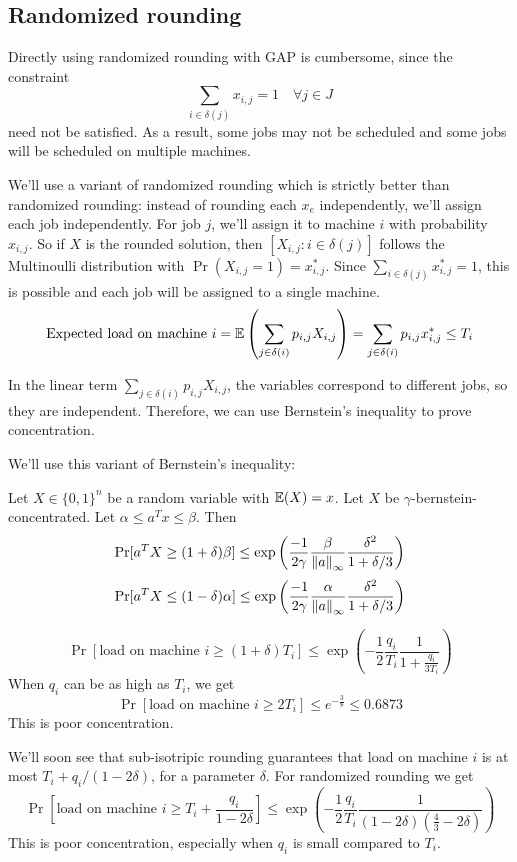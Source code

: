 \subsection{Randomized rounding}

Directly using randomized rounding with GAP is cumbersome, since the constraint
\[ \sum_{i \in \delta(j)} x_{i,j} = 1 \quad \forall j \in J \]
need not be satisfied. As a result, some jobs may not be scheduled
and some jobs will be scheduled on multiple machines.

We'll use a variant of randomized rounding which is strictly better than randomized rounding:
instead of rounding each $x_e$ independently, we'll assign each job independently.
For job $j$, we'll assign it to machine $i$ with probability $x_{i,j}$.
So if $X$ is the rounded solution, then $[X_{i,j}: i \in \delta(j)]$
follows the Multinoulli distribution with $\Pr(X_{i,j} = 1) = x_{i,j}^*$.
Since $\sum_{i \in \delta(j)} x_{i,j}^* = 1$, this is possible and each job
will be assigned to a single machine.
\[ \textrm{Expected load on machine } i
= \operatorname{\mathbb{E}}\left(\sum_{j \in \delta(i)} p_{i,j}X_{i,j}\right)
= \sum_{j \in \delta(i)} p_{i,j}x_{i,j}^*
\le T_i \]

In the linear term $\sum_{j \in \delta(i)} p_{i,j}X_{i,j}$,
the variables correspond to different jobs, so they are independent.
Therefore, we can use Bernstein's inequality to prove concentration.

We'll use this variant of Bernstein's inequality:
\begin{lemma}
\label{thm:my-bern}
Let $X \in \{0, 1\}^n$ be a random variable with $\operatorname{\mathbb{E}}(X) = x$.
Let $X$ be $\gamma$-bernstein-concentrated.
Let $\alpha \le a^Tx \le \beta$. Then
\[ \Pr[ a^TX \ge (1+\delta)\beta ]
\le \exp\left(\frac{-1}{2\gamma} \frac{\beta}{\left\lVert a \right\rVert_{\infty}} \frac{\delta^2}{1+\delta/3} \right) \]
\[ \Pr[ a^TX \le (1-\delta)\alpha ]
\le \exp\left(\frac{-1}{2\gamma} \frac{\alpha}{\left\lVert a \right\rVert_{\infty}} \frac{\delta^2}{1+\delta/3} \right) \]
\end{lemma}
\[ \Pr[\textrm{load on machine } i \ge (1+\delta)T_i]
\le \exp\left( -\frac{1}{2} \frac{q_i}{T_i} \frac{1}{1+\frac{q_i}{3T_i}} \right) \]
When $q_i$ can be as high as $T_i$, we get
\[ \Pr[\textrm{load on machine } i \ge 2T_i]
\le e^{-\frac{3}{8}} \le 0.6873 \]
This is poor concentration.

We'll soon see that sub-isotripic rounding guarantees that load on machine $i$
is at most $T_i + q_i/(1-2\delta)$, for a parameter $\delta$. For randomized rounding we get
\[ \Pr\left[\textrm{load on machine } i \ge T_i + \frac{q_i}{1-2\delta} \right]
\le \exp\left( -\frac{1}{2} \frac{q_i}{T_i} \frac{1}{(1-2\delta)(\frac{4}{3}-2\delta)}\right) \]
This is poor concentration, especially when $q_i$ is small compared to $T_i$.
